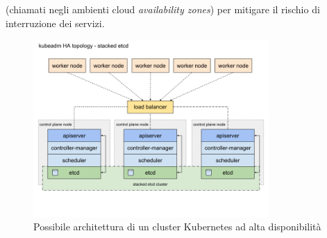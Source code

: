 \documentclass[12pt,a4paper,openright,twoside]{book}
\begin{document}
(chiamati negli ambienti cloud \textit{availability zones}) per mitigare il rischio di interruzione dei servizi\cite{kubernetes}.
%
\begin{figure}[!hbt]
    \centering
    \includegraphics[width=0.8\textwidth]{figures/kube-ha-topo.png}
    \caption{Possibile architettura di un cluster Kubernetes ad alta disponibilità}
    \label{fig:kube-ha-topo}
\end{figure}
\FloatBarrier
\end{document}
